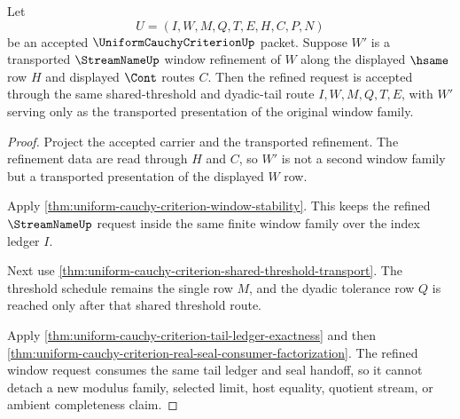 \begin{theorem}
\label{thm:uniform-cauchy-criterion-window-refinement}
Let
$$
U=(I,W,M,Q,T,E,H,C,P,N)
$$
be an accepted $\UniformCauchyCriterionUp$ packet. Suppose $W'$ is a transported $\StreamNameUp$ window refinement of $W$ along the displayed $\hsame$ row $H$ and displayed $\Cont$ routes $C$. Then the refined request is accepted through the same shared-threshold and dyadic-tail route $I,W,M,Q,T,E$, with $W'$ serving only as the transported presentation of the original window family.
\end{theorem}
\begin{proof}
Project the accepted carrier and the transported refinement. The refinement data are read through $H$ and $C$, so $W'$ is not a second window family but a transported presentation of the displayed $W$ row.

Apply \autoref{thm:uniform-cauchy-criterion-window-stability}. This keeps the refined $\StreamNameUp$ request inside the same finite window family over the index ledger $I$.

Next use \autoref{thm:uniform-cauchy-criterion-shared-threshold-transport}. The threshold schedule remains the single row $M$, and the dyadic tolerance row $Q$ is reached only after that shared threshold route.

Apply \autoref{thm:uniform-cauchy-criterion-tail-ledger-exactness} and then \autoref{thm:uniform-cauchy-criterion-real-seal-consumer-factorization}. The refined window request consumes the same tail ledger and seal handoff, so it cannot detach a new modulus family, selected limit, host equality, quotient stream, or ambient completeness claim.
\end{proof}

